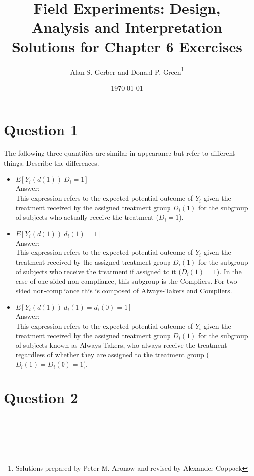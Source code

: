 \documentclass[11pt,notitlepage]{article}\usepackage[]{graphicx}\usepackage[]{color}
\title{Field Experiments: Design, Analysis and Interpretation \\
Solutions for Chapter 6 Exercises}
\author{Alan S. Gerber and Donald P. Green\footnote{Solutions prepared by Peter M. Aronow and revised by Alexander Coppock}}
\date{\today}
\makeatletter
\newenvironment{kframe}{%
 \def\at@end@of@kframe{}%
 \ifinner\ifhmode%
  \def\at@end@of@kframe{\end{minipage}}%
  \begin{minipage}{\columnwidth}%
 \fi\fi%
 \def\FrameCommand##1{\hskip\@totalleftmargin \hskip-\fboxsep
 \colorbox{shadecolor}{##1}\hskip-\fboxsep
     \hskip-\linewidth \hskip-\@totalleftmargin \hskip\columnwidth}%
 \MakeFramed {\advance\hsize-\width
   \@totalleftmargin\z@ \linewidth\hsize
   \@setminipage}}%
 {\par\unskip\endMakeFramed%
 \at@end@of@kframe}
\newenvironment{knitrout}{}{} %
\makeatother
\begin{document}
\maketitle


\section*{Question 1}
The following three quantities are similar in appearance but refer to different things. Describe the differences.
\begin{itemize}
\item $E[Y_i(d(1))|D_i = 1]$ \\
Answer:\\
This expression refers to the expected potential outcome of $Y_i$ given the treatment received by the assigned treatment group $D_i(1)$ for the subgroup of subjects who actually receive the treatment ($D_i=1$).
\item $E[Y_i(d(1))|d_i(1) = 1]$ \\
Answer:\\
This expression refers to the expected potential outcome of $Y_i$ given the treatment received by the assigned treatment group $D_i(1)$ for the subgroup of subjects who receive the treatment if assigned to it ($D_i(1)=1$). In the case of one-sided non-compliance, this subgroup is the Compliers. For two-sided non-compliance this is composed of Always-Takers and Compliers.
\item $E[Y_i(d(1))|d_i(1) = d_i(0) = 1]$\\
Answer:\\
This expression refers to the expected potential outcome of $Y_i$ given the treatment received by the assigned treatment group $D_i (1)$ for the subgroup of subjects known as Always-Takers, who always receive the treatment regardless of whether they are assigned to the treatment group ($D_i (1)=D_i (0)=1$). 

\end{itemize}

\section*{Question 2}
\begin{knitrout}
\color{fgcolor}\begin{kframe}
\begin{verbatim}





\end{verbatim}
\end{kframe}
\end{knitrout}
\end{document}

